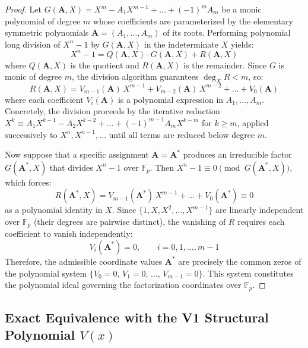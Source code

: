 \documentclass[12pt]{article}
\theoremstyle{plain}
\begin{document}
\begin{proof}
Let $G(\mathbf{A}, X) = X^m - A_1 X^{m-1} + \dots + (-1)^m A_m$ be a monic polynomial of degree $m$ whose coefficients are parameterized by the elementary symmetric polynomials $\mathbf{A} = (A_1, \dots, A_m)$ of its roots. Performing polynomial long division of $X^n - 1$ by $G(\mathbf{A}, X)$ in the indeterminate $X$ yields:
\begin{equation}
    X^n - 1 = Q(\mathbf{A}, X) \cdot G(\mathbf{A}, X) + R(\mathbf{A}, X)
\end{equation}
where $Q(\mathbf{A}, X)$ is the quotient and $R(\mathbf{A}, X)$ is the remainder. Since $G$ is monic of degree $m$, the division algorithm guarantees $\deg_X R < m$, so:
\begin{equation}
    R(\mathbf{A}, X) = V_{m-1}(\mathbf{A})\, X^{m-1} + V_{m-2}(\mathbf{A})\, X^{m-2} + \dots + V_0(\mathbf{A})
\end{equation}
where each coefficient $V_i(\mathbf{A})$ is a polynomial expression in $A_1, \dots, A_m$. Concretely, the division proceeds by the iterative reduction $X^k \equiv A_1 X^{k-1} - A_2 X^{k-2} + \dots + (-1)^{m-1} A_m X^{k-m}$ for $k \geq m$, applied successively to $X^n, X^{n-1}, \dots$ until all terms are reduced below degree $m$.

Now suppose that a specific assignment $\mathbf{A} = \mathbf{A}^*$ produces an irreducible factor $G(\mathbf{A}^*, X)$ that divides $X^n - 1$ over $\mathbb{F}_p$. Then $X^n - 1 \equiv 0 \pmod{G(\mathbf{A}^*, X)}$, which forces:
\begin{equation}
    R(\mathbf{A}^*, X) = V_{m-1}(\mathbf{A}^*)\, X^{m-1} + \dots + V_0(\mathbf{A}^*) \equiv 0
\end{equation}
as a polynomial identity in $X$. Since $\{1, X, X^2, \dots, X^{m-1}\}$ are linearly independent over $\mathbb{F}_p$ (their degrees are pairwise distinct), the vanishing of $R$ requires each coefficient to vanish independently:
\begin{equation}
    V_i(\mathbf{A}^*) = 0, \qquad i = 0, 1, \dots, m-1
\end{equation}
Therefore, the admissible coordinate values $\mathbf{A}^*$ are precisely the common zeros of the polynomial system $\{V_0 = 0, \, V_1 = 0, \, \dots, \, V_{m-1} = 0\}$. This system constitutes the polynomial ideal governing the factorization coordinates over $\mathbb{F}_p$.
\end{proof}

\subsection{Exact Equivalence with the V1 Structural Polynomial $V(x)$}
\end{document}

